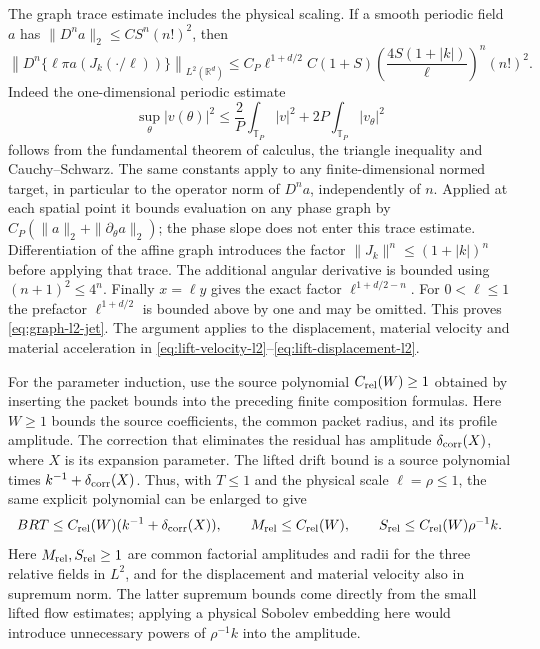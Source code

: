 \documentclass[11pt]{article}
\newcommand{\R}{\mathbb R}
\theoremstyle{definition}
\begin{document}
The graph trace estimate includes the physical scaling. If a smooth
periodic field $a$ has
$\|D^n a\|_2\le C S^n(n!)^2$, then
\begin{equation}\label{eq:graph-l2-jet}
 \left\|D^n\{\ell\pi a(J_k(\cdot/\ell))\}\right\|_{L^2(\R^d)}
 \le C_P\ell^{1+d/2}C(1+S)
       \left(\frac{4S(1+|k|)}\ell\right)^n(n!)^2.
\end{equation}
Indeed the one-dimensional periodic estimate
\[
 \sup_\theta|v(\theta)|^2
   \le\frac2P\int_{\mathbb T_P}|v|^2
                   +2P\int_{\mathbb T_P}|v_\theta|^2
\]
follows from the fundamental theorem of calculus, the triangle
inequality and Cauchy--Schwarz. The same constants apply to any
finite-dimensional normed target, in particular to the operator norm
of $D^n a$, independently of $n$. Applied at each spatial point it
bounds evaluation on any phase graph by
$C_P(\|a\|_2+\|\partial_\theta a\|_2)$; the phase slope does not
enter this trace estimate. Differentiation of the affine graph introduces the factor
$\|J_k\|^n\le(1+|k|)^n$ before applying that trace. The additional
angular derivative is bounded using
$(n+1)^2\le4^n$. Finally $x=\ell y$ gives the exact factor
$\ell^{1+d/2-n}$. For $0<\ell\le1$ the prefactor
$\ell^{1+d/2}$ is bounded above by one and may be omitted. This proves
\eqref{eq:graph-l2-jet}. The argument applies to the
displacement, material velocity and material acceleration in
\eqref{eq:lift-velocity-l2}--\eqref{eq:lift-displacement-l2}.

For the parameter induction, use the source polynomial
$C_{\rm rel}(W)\geq1$ obtained by inserting the packet bounds into
the preceding finite composition formulas. Here $W\geq1$ bounds the
source coefficients, the common packet radius, and its profile amplitude.
The correction that eliminates the residual has amplitude
$\delta_{\rm corr}(X)$, where $X$ is its expansion parameter.
The lifted drift bound is a source polynomial times
$k^{-1}+\delta_{\rm corr}(X)$. Thus, with $T\leq1$ and the physical
scale $\ell=\rho\leq1$, the same explicit polynomial can be enlarged to
give
\[
 BRT\leq C_{\rm rel}(W)(k^{-1}+\delta_{\rm corr}(X)),\qquad
 M_{\rm rel}\leq C_{\rm rel}(W),\qquad
 S_{\rm rel}\leq C_{\rm rel}(W)\rho^{-1}k.
\]
Here $M_{\rm rel},S_{\rm rel}\geq1$ are common factorial amplitudes and
radii for the three relative fields in $L^2$, and for the
displacement and material velocity also in supremum norm. The latter
supremum bounds come directly from the small lifted flow estimates;
applying a physical Sobolev embedding here would introduce unnecessary
powers of $\rho^{-1}k$ into the amplitude.
\end{document}
